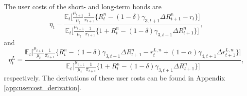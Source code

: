 \documentclass[11pt,a4paper,margin=1.5in]{article}
\begin{document}
The user costs of the short- and long-term bonds are 
\begin{equation}
	\eta_t = \frac{\mathbb{E}_t \Big[ \frac{\mu_{t+1}}{\mu_{t}}\frac{1}{\pi_{t+1}} \Big\{ R^n_t - (1-\delta)\gamma_{3,t+1}\Delta R^n_{t+1} - r_t \Big\}\Big]}{\mathbb{E}_t \Big[ \frac{\mu_{t+1}}{\mu_{t}}\frac{1}{\pi_{t+1}} \Big\{ 1+ R^n_t - (1-\delta)\gamma_{3,t+1}\Delta R^n_{t+1}\Big\}\Big]},
\end{equation}
and
\begin{equation}
\eta^L_t = \frac{\mathbb{E}_t \Big[ \frac{\mu_{t+1}}{\mu_{t}}\frac{1}{\pi_{t+1}} \Big\{ R^n_t  - (1-\delta)\gamma_{3,t+1}\Delta R^n_{t+1} - r^{L,n}_t + (1-\alpha)\gamma_{4,t+1}\Delta r^{L,n}_{t+1}\Big\}\Big]}{\mathbb{E}_t \Big[ \frac{\mu_{t+1}}{\mu_{t}}\frac{1}{\pi_{t+1}} \Big\{ 1+ R^n_t - (1-\delta)\gamma_{3,t+1}\Delta R^n_{t+1}\Big\}\Big]},
\label{eq:usercost_LT}
\end{equation}
respectively.
The derivations of these user costs can be found in Appendix \ref{app:usercost_derivation}.
\end{document}
